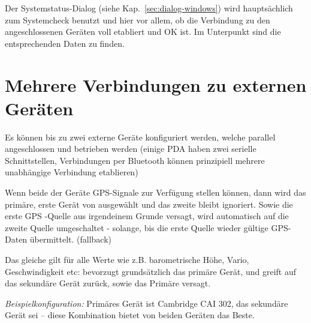 Der Systemstatus-Dialog (siehe Kap.~\ref{sec:dialog-windows}) wird hauptsächlich zum Systemcheck benutzt und hier vor allem, ob die Verbindung zu den angeschlossenen 
Geräten voll etabliert und OK ist. 
Im Unterpunkt  sind die entsprechenden Daten zu finden.
\section{Mehrere Verbindungen zu externen Geräten}

Es können bis zu zwei externe Geräte konfiguriert werden, welche parallel angeschlossen und betrieben werden (einige \textsf{PDA} haben zwei serielle Schnittstellen, Verbindungen per Bluetooth können prinzipiell mehrere unabhängige Verbindung etablieren)

Wenn  beide der Geräte GPS-Signale zur Verfügung stellen können, dann wird das primäre, erste Gerät von \xc ausgewählt und das zweite bleibt ignoriert. Sowie die erste GPS -Quelle aus irgendeinem Grunde versagt, wird automatisch auf die zweite Quelle umgeschaltet - solange, bis die erste Quelle wieder gültige GPS-Daten übermittelt. (fallback)

Das gleiche gilt für alle Werte wie z.B. barometrische Höhe, Vario, Geschwindigkeit etc:
\xc bevorzugt grundsätzlich das primäre Gerät, und greift auf das sekundäre Gerät zurück, sowie das Primäre versagt.

\textit{Beispielkonfiguration:}
Primäres Gerät ist Cambridge CAI 302, das sekundäre Gerät sei \fl -- diese Kombination bietet von beiden Geräten das Beste.
